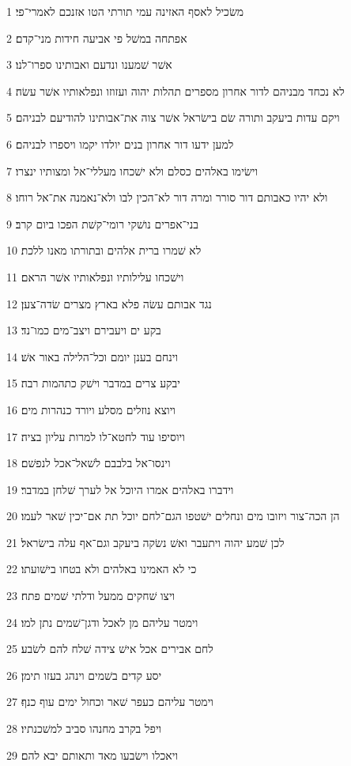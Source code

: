 \par 1 משׂכיל לאסף האזינה עמי תורתי הטו אזנכם לאמרי־פי׃
\par 2 אפתחה במשׁל פי אביעה חידות מני־קדם׃
\par 3 אשׁר שׁמענו ונדעם ואבותינו ספרו־לנו׃
\par 4 לא נכחד מבניהם לדור אחרון מספרים תהלות יהוה ועזוזו ונפלאותיו אשׁר עשׂה׃
\par 5 ויקם עדות ביעקב ותורה שׂם בישׂראל אשׁר צוה את־אבותינו להודיעם לבניהם׃
\par 6 למען ידעו דור אחרון בנים יולדו יקמו ויספרו לבניהם׃
\par 7 וישׂימו באלהים כסלם ולא ישׁכחו מעללי־אל ומצותיו ינצרו׃
\par 8 ולא יהיו כאבותם דור סורר ומרה דור לא־הכין לבו ולא־נאמנה את־אל רוחו׃
\par 9 בני־אפרים נושׁקי רומי־קשׁת הפכו ביום קרב׃
\par 10 לא שׁמרו ברית אלהים ובתורתו מאנו ללכת׃
\par 11 וישׁכחו עלילותיו ונפלאותיו אשׁר הראם׃
\par 12 נגד אבותם עשׂה פלא בארץ מצרים שׂדה־צען׃
\par 13 בקע ים ויעבירם ויצב־מים כמו־נד׃
\par 14 וינחם בענן יומם וכל־הלילה באור אשׁ׃
\par 15 יבקע צרים במדבר וישׁק כתהמות רבה׃
\par 16 ויוצא נוזלים מסלע ויורד כנהרות מים׃
\par 17 ויוסיפו עוד לחטא־לו למרות עליון בציה׃
\par 18 וינסו־אל בלבבם לשׁאל־אכל לנפשׁם׃
\par 19 וידברו באלהים אמרו היוכל אל לערך שׁלחן במדבר׃
\par 20 הן הכה־צור ויזובו מים ונחלים ישׁטפו הגם־לחם יוכל תת אם־יכין שׁאר לעמו׃
\par 21 לכן שׁמע יהוה ויתעבר ואשׁ נשׂקה ביעקב וגם־אף עלה בישׂראל׃
\par 22 כי לא האמינו באלהים ולא בטחו בישׁועתו׃
\par 23 ויצו שׁחקים ממעל ודלתי שׁמים פתח׃
\par 24 וימטר עליהם מן לאכל ודגן־שׁמים נתן למו׃
\par 25 לחם אבירים אכל אישׁ צידה שׁלח להם לשׂבע׃
\par 26 יסע קדים בשׁמים וינהג בעזו תימן׃
\par 27 וימטר עליהם כעפר שׁאר וכחול ימים עוף כנף׃
\par 28 ויפל בקרב מחנהו סביב למשׁכנתיו׃
\par 29 ויאכלו וישׂבעו מאד ותאותם יבא להם׃
